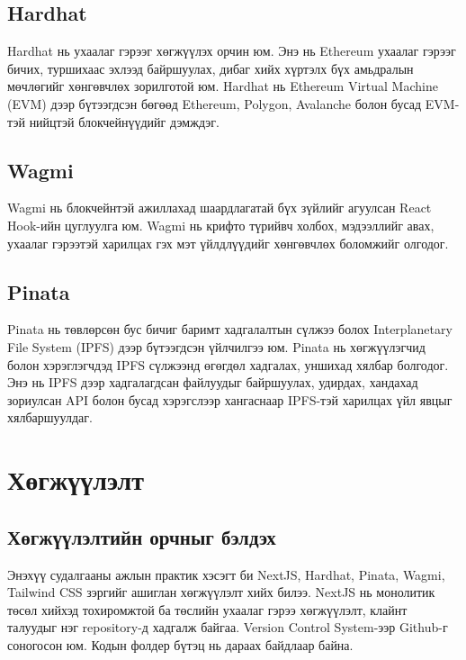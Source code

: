 \subsection{Hardhat}
Hardhat нь ухаалаг гэрээг хөгжүүлэх орчин юм. Энэ нь Ethereum ухаалаг гэрээг бичих, туршихаас эхлээд байршуулах, дибаг хийх хүртэлх бүх амьдралын мөчлөгийг хөнгөвчлөх зорилготой юм. Hardhat нь Ethereum Virtual Machine (EVM) дээр бүтээгдсэн бөгөөд Ethereum, Polygon, Avalanche болон бусад EVM-тэй нийцтэй блокчейнүүдийг дэмждэг.

\subsection{Wagmi}
Wagmi нь блокчейнтэй ажиллахад шаардлагатай бүх зүйлийг агуулсан React Hook-ийн цуглуулга юм. Wagmi нь крифто түрийвч холбох, мэдээллийг авах, ухаалаг гэрээтэй харилцах гэх мэт үйлдлүүдийг хөнгөвчлөх боломжийг олгодог.

\subsection{Pinata}
Pinata нь төвлөрсөн бус бичиг баримт хадгалалтын сүлжээ болох Interplanetary File System (IPFS) дээр бүтээгдсэн үйлчилгээ юм. Pinata нь хөгжүүлэгчид болон хэрэглэгчдэд IPFS сүлжээнд өгөгдөл хадгалах, уншихад хялбар болгодог. Энэ нь IPFS дээр хадгалагдсан файлуудыг байршуулах, удирдах, хандахад зориулсан API болон бусад хэрэгслээр хангаснаар IPFS-тэй харилцах үйл явцыг хялбаршуулдаг.

\newpage
\section{Хөгжүүлэлт}

\subsection{Хөгжүүлэлтийн орчныг бэлдэх}
Энэхүү судалгааны ажлын практик хэсэгт би NextJS, Hardhat, Pinata, Wagmi, Tailwind CSS зэргийг ашиглан хөгжүүлэлт хийх билээ. NextJS нь монолитик төсөл хийхэд тохиромжтой ба төслийн ухаалаг гэрээ хөгжүүлэлт, клайнт талуудыг нэг repository-д хадгалж байгаа. Version Control System-ээр Github-г соногосон юм. Кодын фолдер бүтэц нь дараах байдлаар байна.

